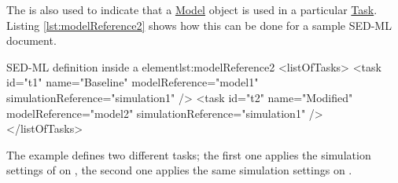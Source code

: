The  is also used to indicate that a \hyperref[class:model]{Model} object is used in a particular  \hyperref[class:task]{Task}. Listing \ref{lst:modelReference2} shows how this can be done for a sample SED-ML document.
%
\begin{myXmlLst}{SED-ML  definition inside a  element}{lst:modelReference2}
<listOfTasks>
 <task id="t1" name="Baseline" modelReference="model1" simulationReference="simulation1" />
 <task id="t2" name="Modified" modelReference="model2" simulationReference="simulation1" />
</listOfTasks>
\end{myXmlLst}
%
The example defines two different tasks; the first one applies the simulation settings of  on , the second one applies the same simulation settings on .


